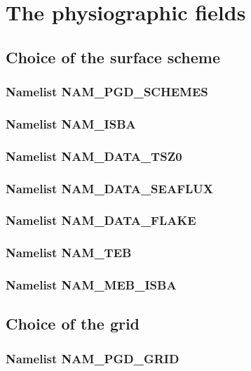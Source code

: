 
\newpage
\section{The physiographic fields}

\subsection{Choice of the surface scheme}
\subsubsection{Namelist NAM\_PGD\_SCHEMES}
\subsubsection{Namelist NAM\_ISBA}
\subsubsection{Namelist NAM\_DATA\_TSZ0}
\subsubsection{Namelist NAM\_DATA\_SEAFLUX}
\subsubsection{Namelist NAM\_DATA\_FLAKE}
\subsubsection{Namelist NAM\_TEB}
\subsubsection{Namelist NAM\_MEB\_ISBA}

\newpage
\subsection{Choice of the grid}
\subsubsection{Namelist NAM\_PGD\_GRID}
